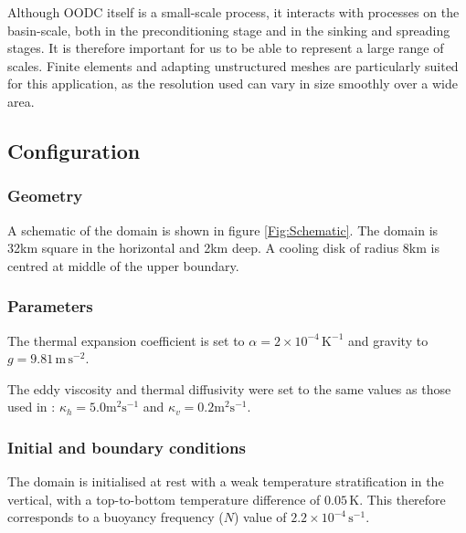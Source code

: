Although OODC itself is a small-scale process, it interacts with
processes on the basin-scale, both in the preconditioning stage and
in the sinking and spreading stages. It is therefore important for us
to be able to represent a large range of scales. Finite elements and adapting
unstructured meshes are particularly suited for this application, as the
resolution used can vary in size smoothly over a wide area.

\subsection{Configuration}

\subsubsection{Geometry}



A schematic of the domain is shown in figure \ref{Fig:Schematic}.
The domain is 32km square in the horizontal and 2km deep. A cooling disk of radius
8km is centred at middle of the upper boundary.




\subsubsection{Parameters}
The thermal expansion coefficient is set to
$\alpha=2 \times 10^{-4} \,\mathrm{K}^{-1}$ and gravity to $g=9.81 \,\mathrm{m}\,\mathrm{s}^{-2}$.

The eddy viscosity
and thermal diffusivity were set to the same values as those
used in \cite{jones1993}: $\kappa_h = 5.0 \mathrm{m}^2\mathrm{s}^{-1}$ and
$\kappa_v = 0.2 \mathrm{m}^2\mathrm{s}^{-1}$.


\subsubsection{Initial and boundary conditions}
The domain is initialised at rest with a weak temperature stratification
in the vertical, with a top-to-bottom temperature difference of
$0.05\,$K.
This therefore corresponds to a buoyancy frequency ($N$) value
of $2.2 \times 10^{-4} \,\mathrm{s}^{-1}$.


